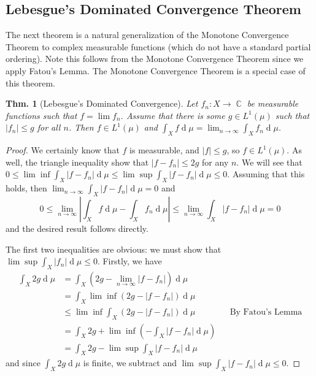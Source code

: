 \documentclass[12pt, a4paper]{book}
\DeclareMathOperator{\C}{\mathbb{C}}
\renewcommand{\d}[1]{\ensuremath{\operatorname{d}\!{#1}}} %
\newtheorem{theorem}{Thm.}[section]
\theoremstyle{nonumberplain}
\newtheorem{proof}{Proof}
\begin{document}
\subsection{Lebesgue's Dominated Convergence Theorem}
The next theorem is a natural generalization of the Monotone Convergence Theorem to complex measurable functions (which do not have a standard partial ordering).
Note this follows from the Monotone Convergence Theorem since we apply Fatou's Lemma.
The Monotone Convergence Theorem is a special case of this theorem.
\begin{theorem}[Lebesgue's Dominated Convergence]
    Let $f_n:X\to\C$ be measurable functions such that $f=\lim f_n$.
    Assume that there is some $g\in L^1(\mu)$ such that $|f_n|\leq g$ for all $n$.
    Then $f\in L^1(\mu)$ and $\int_X f\d{\mu}=\lim_{n\to\infty}\int_X f_n\d{\mu}$.
\end{theorem}
\begin{proof}
    We certainly know that $f$ is measurable, and $|f|\leq g$, so $f\in L^1(\mu)$.
    As well, the triangle inequality show that $|f-f_n|\leq 2g$ for any $n$.
    We will see that $0\leq \lim\inf\int_X|f-f_n|\d{\mu}\leq\lim\sup\int_X|f-f_n|\d{\mu}\leq 0$.
    Assuming that this holds, then $\lim_{n\to\infty}\int_X|f-f_n|\d{\mu}=0$ and
    \[0\leq\lim_{n\to\infty}\left\lvert\int_Xf\d{\mu}-\int_Xf_n\d{\mu}\right\rvert\leq\lim_{n\to\infty}\int_X|f-f_n|\d{\mu}=0\]
    and the desired result follows directly.

    The first two inequalities are obvious: we must show that $\lim\sup\int_X|f_n|\d{\mu}\leq 0$.
    Firstly, we have
    \begin{align*}
        \int_X 2g\d{\mu} &= \int_X \left(2g-\lim_{n\to\infty}|f-f_n|\right)\d{\mu}\\
                         &= \int_X\lim\inf(2g-|f-f_n|)\d{\mu}\\
                         &\leq \lim\inf\int_X(2g-|f-f_n|)\d{\mu} &&\text{By Fatou's Lemma}\\
                         &= \int_X 2g+\lim\inf\left(-\int_X|f-f_n|\d{\mu}\right)\\
                         &= \int_X 2g-\lim\sup \int_X|f-f_n|\d{\mu}
    \end{align*}
    and since $\int_X 2g\d{\mu}$ is finite, we subtract and $\lim\sup\int_X|f-f_n|\d{\mu}\leq 0$.
\end{proof}
\end{document}
